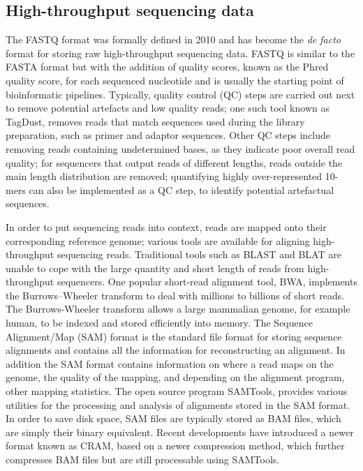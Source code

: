 \subsection{High-throughput sequencing data}

The FASTQ format was formally defined in 2010\cite{pmid20015970} and has become the \textit{de facto} format for storing raw high-throughput sequencing data. FASTQ is similar to the FASTA format but with the addition of quality scores, known as the Phred quality score, for each sequenced nucleotide and is usually the starting point of bioinformatic pipelines. Typically, quality control (QC) steps are carried out next to remove potential artefacts and low quality reads; one such tool known as TagDust\cite{pmid19737799}, removes reads that match sequences used during the library preparation, such as primer and adaptor sequences. Other QC steps include removing reads containing undetermined bases, as they indicate poor overall read quality; for sequencers that output reads of different lengths, reads outside the main length distribution are removed; quantifying highly over-represented 10-mers can also be implemented as a QC step\cite{pmid21088025}, to identify potential artefactual sequences.

In order to put sequencing reads into context, reads are mapped onto their corresponding reference genome; various tools are available for aligning high-throughput sequencing reads. Traditional tools such as BLAST\cite{pmid2231712} and BLAT\cite{pmid11932250} are unable to cope with the large quantity and short length of reads from high-throughput sequencers. One popular short-read alignment tool, BWA\cite{pmid19451168}, implements the Burrows–Wheeler transform to deal with millions to billions of short reads. The Burrows-Wheeler transform allows a large mammalian genome, for example human, to be indexed and stored efficiently into memory\cite{pmid19430453}. The Sequence Alignment/Map (SAM) format\cite{pmid19505943} is the standard file format for storing sequence alignments and contains all the information for reconstructing an alignment. In addition the SAM format contains information on where a read maps on the genome, the quality of the mapping, and depending on the alignment program, other mapping statistics. The open source program SAMTools\cite{Li15082009}, provides various utilities for the processing and analysis of alignments stored in the SAM format. In order to save disk space, SAM files are typically stored as BAM files, which are simply their binary equivalent. Recent developments have introduced a newer format known as CRAM, based on a newer compression method\cite{pmid21245279}, which further compresses BAM files but are still processable using SAMTools.

